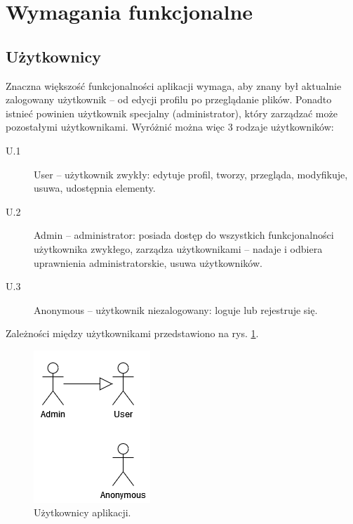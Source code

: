 \documentclass[a4paper,twoside,12pt]{book}
\begin{document}
\section{Wymagania funkcjonalne}

\subsection{Użytkownicy}
Znaczna większość funkcjonalności aplikacji wymaga, aby znany był aktualnie zalogowany użytkownik -- od edycji profilu po przeglądanie plików. Ponadto istnieć powinien użytkownik specjalny (administrator), który zarządzać może pozostałymi użytkownikami. Wyróżnić można więc 3 rodzaje użytkowników:
\begin{description}
	\item [U.1] User -- użytkownik zwykły: edytuje profil, tworzy, przegląda, modyfikuje, usuwa, udostępnia elementy.
	\item [U.2] Admin -- administrator: posiada dostęp do wszystkich funkcjonalności użytkownika zwykłego, zarządza użytkownikami -- nadaje i odbiera uprawnienia administratorskie, usuwa użytkowników.
	\item [U.3] Anonymous -- użytkownik niezalogowany: loguje lub rejestruje się.
\end{description}	

Zależności między użytkownikami przedstawiono na rys. \ref{fig:uml-users}.

\begin{figure}
\centering
\includegraphics{./UML-Users.png}
\caption{Użytkownicy aplikacji.}
\label{fig:uml-users}
\end{figure}
\end{document}
